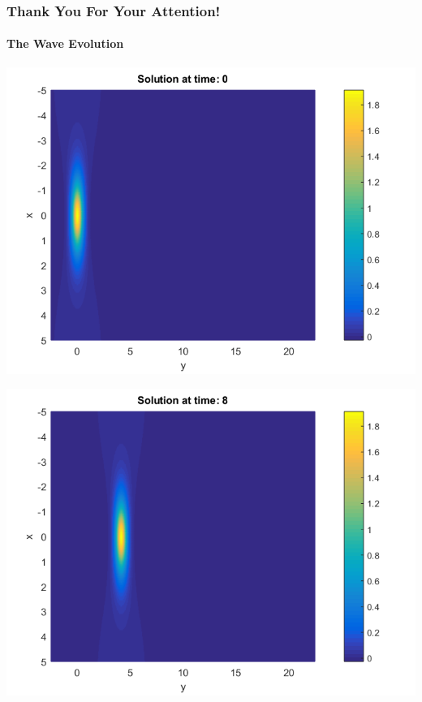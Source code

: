 \documentclass{beamer}
\begin{document}
\begin{frame}
\frametitle{Thank You For Your Attention!}
\framesubtitle{The Wave Evolution}
\begin{center}\vspace{0.4cm}
	\begin{minipage}[b]{0.30\linewidth}
		\includegraphics[width=\linewidth]{figures/Solution_bt3_t=0.png}
	\end{minipage}	
	\begin{minipage}[b]{0.30\linewidth}
		\includegraphics[width=\linewidth]{figures/Solution_bt3_t=8.png}
	\end{minipage}	
	\begin{minipage}[b]{0.30\linewidth}

\end{minipage}
\end{center}
\end{frame}
\end{document}
